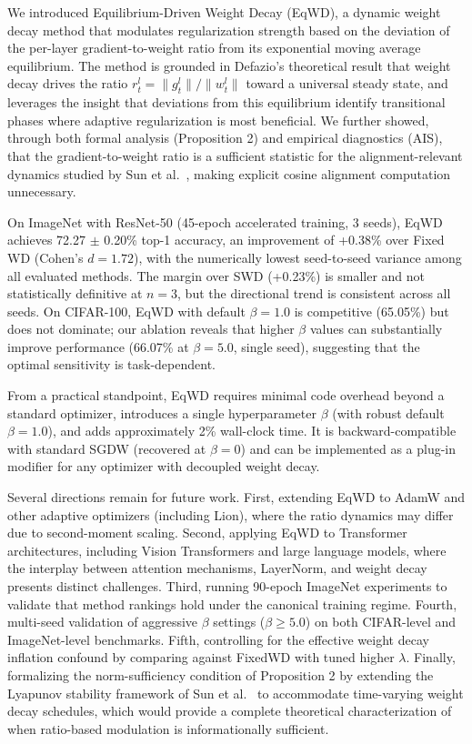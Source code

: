 \documentclass{article}
\begin{document}
We introduced Equilibrium-Driven Weight Decay (EqWD), a dynamic weight
decay method that modulates regularization strength based on the
deviation of the per-layer gradient-to-weight ratio from its exponential
moving average equilibrium. The method is grounded in Defazio's
\citep{defazio2025} theoretical result that weight decay drives the ratio
$r_t^l = \|g_t^l\| / \|w_t^l\|$ toward a universal steady state, and
leverages the insight that deviations from this equilibrium identify
transitional phases where adaptive regularization is most beneficial. We
further showed, through both formal analysis (Proposition 2) and
empirical diagnostics (AIS), that the gradient-to-weight ratio is a
sufficient statistic for the alignment-relevant dynamics studied by Sun
et al.~\citep{sun2025cvpr}, making explicit cosine alignment computation
unnecessary.

On ImageNet with ResNet-50 (45-epoch accelerated training, 3 seeds),
EqWD achieves 72.27 $\pm$ 0.20\% top-1 accuracy, an improvement of
+0.38\% over Fixed WD (Cohen's $d = 1.72$), with the numerically
lowest seed-to-seed variance among all evaluated methods. The margin
over SWD (+0.23\%) is smaller and not statistically definitive at
$n = 3$, but the directional trend is consistent across all seeds. On
CIFAR-100, EqWD with default $\beta = 1.0$ is competitive (65.05\%)
but does not dominate; our ablation reveals that higher $\beta$ values
can substantially improve performance (66.07\% at $\beta = 5.0$,
single seed), suggesting that the optimal sensitivity is task-dependent.

From a practical standpoint, EqWD requires minimal code overhead beyond
a standard optimizer, introduces a single hyperparameter $\beta$ (with
robust default $\beta = 1.0$), and adds approximately 2\% wall-clock
time. It is backward-compatible with standard SGDW (recovered at
$\beta = 0$) and can be implemented as a plug-in modifier for any
optimizer with decoupled weight decay.

Several directions remain for future work. First, extending EqWD to
AdamW and other adaptive optimizers (including Lion), where the ratio
dynamics may differ due to second-moment scaling. Second, applying EqWD
to Transformer architectures, including Vision Transformers and large
language models, where the interplay between attention mechanisms,
LayerNorm, and weight decay presents distinct challenges. Third, running
90-epoch ImageNet experiments to validate that method rankings hold
under the canonical training regime. Fourth, multi-seed validation of
aggressive $\beta$ settings ($\beta \geq 5.0$) on both CIFAR-level
and ImageNet-level benchmarks. Fifth, controlling for the effective
weight decay inflation confound by comparing against FixedWD with tuned
higher $\lambda$. Finally, formalizing the norm-sufficiency condition
of Proposition 2 by extending the Lyapunov stability framework of Sun et
al.~\citep{sun2025cvpr} to accommodate time-varying weight decay
schedules, which would provide a complete theoretical characterization
of when ratio-based modulation is informationally sufficient.
\end{document}
